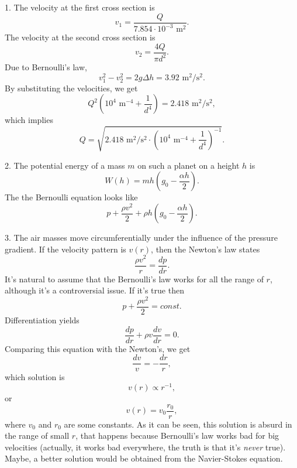 \documentclass[12pt,a4paper,pdflatex]{disser}
\begin{document}
1. The velocity at the first cross section is
$$
  v_1=\frac{Q}{7.854\cdot 10^{-3} \text{ m}^2}.
$$
The velocity at the second cross section is
$$
  v_2=\frac{4Q}{\pi d^2}.
$$
Due to Bernoulli's law,
$$
  v_1^2-v_2^2=2g\Delta h=3.92 \text{ m}^2/\text{s}^2.
$$
By substituting the velocities, we get
$$
  Q^2 \left(10^4 \text{ m}^{-4}+\frac{1}{d^4}\right)=2.418 \text{ m}^2/\text{s}^2,
$$
which implies
$$
  Q=\sqrt{2.418 \text{ m}^2/\text{s}^2 \cdot\left(10^4 \text{ m}^{-4}+\frac{1}{d^4}\right)^{-1}}.
$$

2. The potential energy of a mass $m$ on such a planet on a height $h$ is
$$
  W(h)=mh\left(g_0-\frac{\alpha h}{2}\right).
$$
The the Bernoulli equation looks like
$$
  p+\frac{\rho v^2}{2}+\rho h\left(g_0-\frac{\alpha h}{2}\right).
$$

3. The air masses move circumferentially under the influence of the pressure gradient. If the velocity pattern is $v(r)$, then the Newton's law states 
$$
  \frac{\rho v^2}{r}=\frac{dp}{dr}.
$$
It's natural to assume that the Bernoulli's law works for all the range of $r$, although it's a controversial issue. If it's true then
$$
  p+\frac{\rho v^2}{2}=const.
$$
Differentiation yields
$$
  \frac{dp}{dr}+\rho v \frac{dv}{dr}=0.
$$
Comparing this equation with the Newton's, we get
$$
  \frac{dv}{v}=-\frac{dr}{r},
$$
which solution is
$$
  v(r)\propto r^{-1},
$$
or
$$
  v(r)=v_0 \frac{r_0}{r},
$$
where $v_0$ and $r_0$ are some constants. As it can be seen, this solution is absurd in the range of small $r$, that happens because Bernoulli's law works bad for big velocities (actually, it works bad everywhere, the truth is that it's \textit{never} true). Maybe, a better solution would be obtained from the Navier-Stokes equation.
\end{document}
